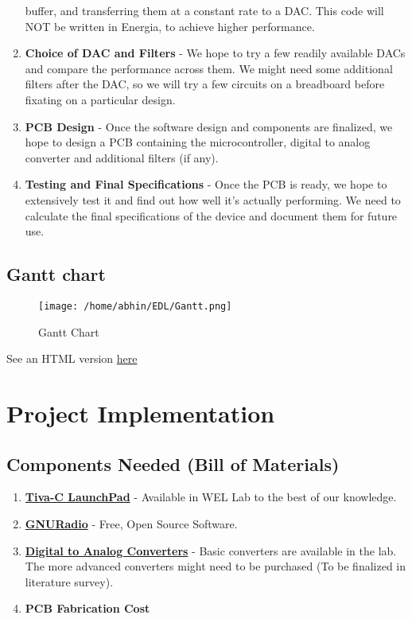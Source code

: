 \documentclass{article}
\begin{document}
\begin{enumerate}
buffer, and transferring them at a constant rate to a DAC. This code will NOT be written in
Energia, to achieve higher performance.
\item \textbf{Choice of DAC and Filters} - We hope to try a few readily available DACs and compare the performance across them. We might need some additional filters after the DAC, so we will try a few circuits on a breadboard before fixating on a particular design.
\item \textbf{PCB Design} - Once the software design and components are finalized, we hope to design a PCB containing the microcontroller, digital to analog converter and additional filters (if any).
\item \textbf{Testing and Final Specifications} - Once the PCB is ready, we hope to extensively test it and find out how well it’s actually performing. We need to calculate the final specifications of the device and document them for future use.
\end{enumerate}
\subsection{Gantt chart}
\begin{figure}[htp]
\centering
\texttt{[image: /home/abhin/EDL/Gantt.png]}
\caption{Gantt Chart}
\label{}
\end{figure}
See an HTML version \href{http://publish.smartsheet.com/5856566e76a544e7a8add24073379be7}{here}
\section{Project Implementation}
\subsection{Components Needed (Bill of Materials)}
\begin{enumerate}
\item \textbf{\href{https://en.wikipedia.org/wiki/Tiva-C_LaunchPad}{Tiva-C LaunchPad}} - Available in WEL Lab to the best of our knowledge.
\item \textbf{\href{http://gnuradio.org/}{GNURadio}} - Free, Open Source Software.
\item \textbf{\href{https://en.wikipedia.org/wiki/Digital-to-analog_converter}{Digital to Analog Converters}} - Basic converters are available in the lab. The more
advanced converters might need to be purchased (To be finalized in literature survey).
\item \textbf{PCB Fabrication Cost}
\end{enumerate}
\end{document}
